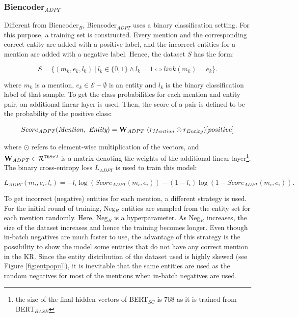 \documentclass{report}
\theoremstyle{definition}
\theoremstyle{remark}
\begin{document}
\subsubsection{Biencoder$_{ADPT}$}
\label{sec:biencoderadaptexplanation}

Different from Biencoder$_{B}$, Biencoder$_{ADPT}$ uses a binary classification setting. For this purpose, a training set is constructed. Every mention and the corresponding correct entity are added with a positive label, and the incorrect entities for a mention are added with a negative label. Hence, the dataset $S$ has the form:

\begin{equation}
    S = \{ (m_k,e_k,l_k) \ | \ l_k \in \{0,1\} \land l_k=1 \iff link(m_k) = e_k \}.
\end{equation}

\noindent where $m_k$ is a mention, $e_k \in \mathcal{E}-\emptyset$ is an entity and $l_k$ is the binary classification label of that sample. To get the class probabilities for each mention and entity pair, an additional linear layer is used. Then, the score of a pair is defined to be the probability of the positive class:

\begin{equation}
    Score_{ADPT}(\textit{Mention},\textit{ Entity}) = \bold{W}_{ADPT} \ (r_{Mention} \odot r_{Entity}) [positive]
\end{equation}

\noindent where $\odot$ refers to element-wise multiplication of the vectors, and $\bold{W}_{ADPT} \in \mathcal{R}^{768x2}$ is a matrix denoting the weights of the additional linear layer\footnote{the size of the final hidden vectors of BERT$_{SC}$ is 768 as it is trained from BERT$_{BASE}$}. The binary cross-entropy loss $L_{ADPT}$ is used to train this model:

\begin{equation}
    L_{ADPT}(m_i,e_i,l_i) = - l_i \log (Score_{ADPT}(m_i,e_i)) - (1-l_i) \log (1-Score_{ADPT}(m_i,e_i)).
\end{equation}

To get incorrect (negative) entities for each mention, a different strategy is used. For the initial round of training, Neg$_{R}$ entities are sampled from the entity set for each mention randomly. Here, Neg$_{R}$ is a hyperparameter. As Neg$_{R}$ increases, the size of the dataset increases and hence the training becomes longer. Even though in-batch negatives are much faster to use, the advantage of this strategy is the possibility to show the model some entities that do not have any correct mention in the KR. Since the entity distribution of the dataset used is highly skewed (see Figure \ref{fig:entpopul}), it is inevitable that the same entities are used as the random negatives for most of the mentions when in-batch negatives are used.
\end{document}
